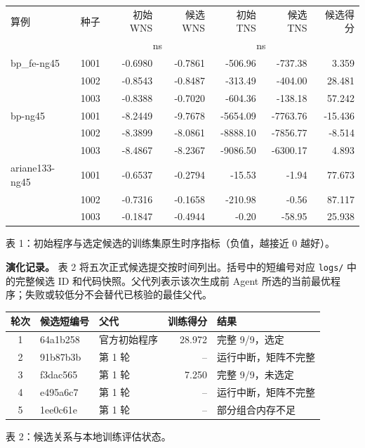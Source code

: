 \documentclass[UTF8,a4paper,11pt]{ctexart}
\begin{document}
\begin{center}\scriptsize
\begin{tabular}{llrrrrr}
\toprule
算例 & 种子 & 初始 WNS & 候选 WNS & 初始 TNS & 候选 TNS & 候选得分\\
 & & \multicolumn{2}{c}{ns} & \multicolumn{2}{c}{ns} & \\
\midrule
bp\_fe-ng45 & 1001 & -0.6980 & -0.7861 & -506.96 & -737.38 & 3.359\\
 & 1002 & -0.8543 & -0.8487 & -313.49 & -404.00 & 28.481\\
 & 1003 & -0.8388 & -0.7020 & -604.36 & -138.18 & 57.242\\
bp-ng45 & 1001 & -8.2449 & -9.7678 & -5654.09 & -7763.76 & -15.436\\
 & 1002 & -8.3899 & -8.0861 & -8888.10 & -7856.77 & -8.514\\
 & 1003 & -8.4867 & -8.2367 & -9086.50 & -6300.17 & 4.893\\
ariane133-ng45 & 1001 & -0.6537 & -0.2794 & -15.53 & -1.94 & 77.673\\
 & 1002 & -0.7316 & -0.1658 & -210.98 & -0.56 & 87.117\\
 & 1003 & -0.1847 & -0.4944 & -0.20 & -58.95 & 25.938\\
\bottomrule
\end{tabular}\par
\smallskip
表 1：初始程序与选定候选的训练集原生时序指标（负值，越接近 0 越好）。
\end{center}


\textbf{演化记录。} 表 2 将五次正式候选提交按时间列出。括号中的短编号对应 \texttt{logs/} 中的完整候选 ID 和代码快照。父代列表示该次生成前 Agent 所选的当前最优程序；失败或较低分不会替代已核验的最佳父代。
\begin{center}\small
\begin{tabular}{cllrl}
\toprule
轮次 & 候选短编号 & 父代 & 训练得分 & 结果\\
\midrule
1 & 64a1b258 & 官方初始程序 & 28.972 & 完整 9/9，选定\\
2 & 91b87b3b & 第 1 轮 & -- & 运行中断，矩阵不完整\\
3 & f3dac565 & 第 1 轮 & 7.250 & 完整 9/9，未选定\\
4 & e495a6c7 & 第 1 轮 & -- & 运行中断，矩阵不完整\\
5 & 1ee0c61e & 第 1 轮 & -- & 部分组合内存不足\\
\bottomrule
\end{tabular}\par
\smallskip 表 2：候选关系与本地训练评估状态。
\end{center}
\end{document}
